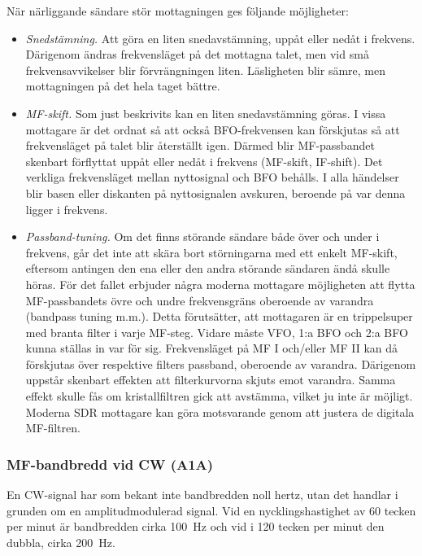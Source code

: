 När närliggande sändare stör mottagningen ges följande möjligheter:
\begin{itemize}
\item \emph{Snedstämning.}
  Att göra en liten snedavstämning, uppåt eller nedåt i frekvens.
  Därigenom ändras frekvensläget på det mottagna talet, men vid små
  frekvensavvikelser blir förvrängningen liten.
  Läsligheten blir sämre, men mottagningen på det hela taget bättre.

\item \emph{MF-skift.}
  Som just beskrivits kan en liten snedavstämning göras.
  I vissa mottagare är det ordnat så att också BFO-frekvensen kan förskjutas
  så att frekvensläget på talet blir återställt igen.
  Därmed blir MF-passbandet skenbart förflyttat uppåt eller nedåt i frekvens
  (MF-skift, IF-shift).
  Det verkliga frekvensläget mellan nyttosignal och BFO behålls.
  I alla händelser blir basen eller diskanten på nyttosignalen avskuren,
  beroende på var denna ligger i frekvens.

\item \emph{Passband-tuning.}
  Om det finns störande sändare både över och under i frekvens, går det inte
  att skära bort störningarna med ett enkelt MF-skift, eftersom antingen den
  ena eller den andra störande sändaren ändå skulle höras.
  För det fallet erbjuder några moderna mottagare möjligheten att flytta
  MF-passbandets övre och undre frekvensgräns oberoende av varandra (bandpass
  tuning m.m.).
  Detta förutsätter, att mottagaren är en trippelsuper med branta filter i
  varje MF-steg.
  Vidare måste VFO, 1:a BFO och 2:a BFO kunna ställas in var för sig.
  Frekvensläget på MF I och/eller MF II kan då förskjutas över respektive
  filters passband, oberoende av varandra.
  Därigenom uppstår skenbart effekten att filterkurvorna skjuts emot varandra.
  Samma effekt skulle fås om kristallfiltren gick att avstämma, vilket ju inte
  är möjligt.
  Moderna SDR mottagare kan göra motsvarande genom att justera de digitala
  MF-filtren.
\end{itemize}

\subsubsection{MF-bandbredd vid CW (A1A)}

En CW-signal har som bekant inte bandbredden noll hertz, utan det handlar i
grunden om en amplitudmodulerad signal.
Vid en nycklingshastighet av 60 tecken per minut är bandbredden cirka
\qty{100}{\hertz} och vid i 120 tecken per minut den dubbla, cirka
\qty{200}{\hertz}.

